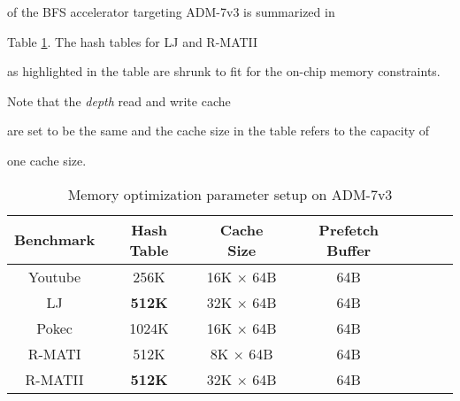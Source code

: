 of the BFS accelerator targeting ADM-7v3 is summarized in 

Table \ref{tab:parameter-setup}. The hash tables for LJ and R-MATII 

as highlighted in the table are shrunk to fit for the on-chip memory constraints. 

Note that the \textit{depth} read and write cache 

are set to be the same and the cache size in the table refers to the capacity of 

one cache size.



\begin{table}

  \vspace{-0.3em}

  \caption{Memory optimization parameter setup on ADM-7v3}

  \label{tab:parameter-setup}



    \centering

  \vspace{-0.3em}

  \begin{tabular}{ccccccc}

    \toprule

      Benchmark & Hash Table & Cache Size & Prefetch Buffer \\

    \midrule

      Youtube  & 256K  & 16K $\times$ 64B & 64B \\

      LJ       & \textbf{512K} & 32K $\times$ 64B & 64B \\

      Pokec    & 1024K & 16K $\times$ 64B & 64B \\

      R-MATI   & 512K  & 8K $\times$  64B & 64B \\

      R-MATII  & \textbf{512K} & 32K $\times$ 64B & 64B \\

  \bottomrule

\end{tabular}

\vspace{-1em}

\end{table}



